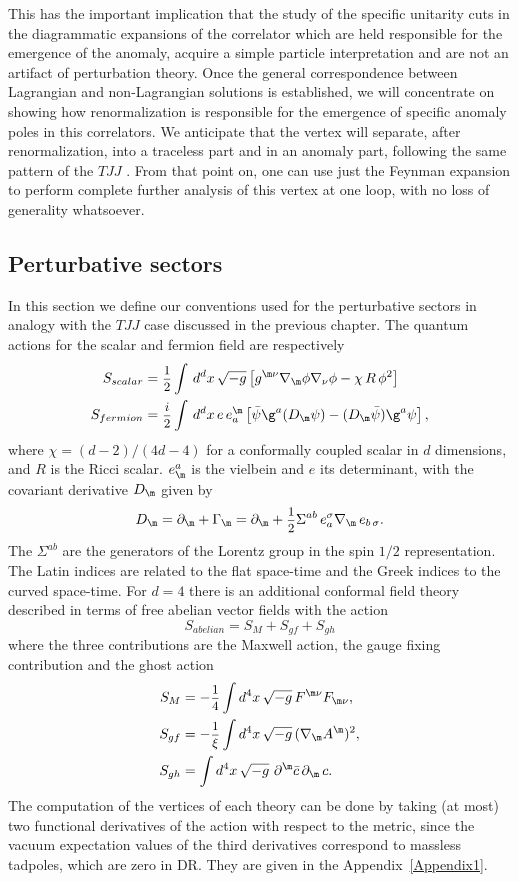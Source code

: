 \documentclass[a4paper,11pt,openright,twoside]{book}
\let\n=\nu      \let\x=\xi     \let\p=\pi      \let\r=\rho
\let\s=\sigma  \let\t=\tau     \let\u=\upsilon \let\f=\phi
\let\c=\chi     \let\y=\psi    \let\w=\omega
\newcommand{\sdfrac}[2]{\mbox{\small$\displaystyle\frac{#1}{#2}$}}
\newcommand{\appref}[1]{Appendix~\ref{#1}}		%
\numberwithin{equation}{section}
\begin{document}
{{This has the important implication that the study of the specific unitarity cuts in the diagrammatic expansions of the correlator \cite{Giannotti:2008cv, Coriano:2014gja} which are held responsible for the emergence of the anomaly, acquire a simple particle interpretation and are not an artifact of perturbation theory. Once the general correspondence between Lagrangian and non-Lagrangian solutions is established, we will concentrate on showing how renormalization is responsible for the emergence of specific anomaly poles 
in this correlators. We anticipate that the vertex will separate, after renormalization, into a traceless part and in an anomaly part, following the same pattern of the $TJJ$ \cite{Coriano:2018zdo}. From that point on, one can use just the Feynman expansion to perform complete further analysis of this vertex at one loop, with no loss of generality whatsoever. 
\subsection{Perturbative sectors}
In this section we define our conventions used for the perturbative sectors in analogy with the $TJJ$ case discussed in the previous chapter. The quantum actions for the scalar and fermion field are respectively
\begin{align}
	S_{scalar}&=\sdfrac{1}{2}\int\, d^dx\,\sqrt{-g}\left[g^{\m\n}\nabla_\m\phi\nabla_\n\phi-\c\, R\,\phi^2\right]\\
	S_{fermion}&=\sdfrac{i}{2}\int\, d^dx\,e\,e^{\m}_a\left[\bar{\psi}\g^a(D_\m\psi)-(D_\m\bar{\psi})\g^a\psi\right],
\end{align}
where $\c =(d-2)/(4d-4)$ for a conformally coupled scalar in $d$ dimensions, and $R$ is the Ricci scalar. $e_\m^a$ is the vielbein and $e$ its determinant,  with the covariant derivative $D_\m$ given by 
\begin{equation}
	D_\m=\partial_\m+\Gamma_\m=\partial_\m+\sdfrac{1}{2}\Sigma^{ab}\,e^\s_a\nabla_\m\,e_{b\,\s}.
\end{equation}
The $\Sigma^{ab}$ are the generators of the Lorentz group in the spin $1/2$ representation. The Latin indices are related to the flat space-time and the Greek indices to the curved space-time. 
For $d=4$ there is an additional conformal field theory described in terms of free abelian vector fields with the action
\begin{equation}
	S_{abelian}=S_{M}+S_{gf}+S_{gh}
\end{equation}
where the three contributions are the Maxwell action, the gauge fixing contribution and the ghost action
\begin{align}
	S_M&=-\sdfrac{1}{4}\int d^4x\,\sqrt{-g}\,F^{\m\n}F_{\m\n},\\
	S_{gf}&=-\sdfrac{1}{\xi}\int d^4x\,\sqrt{-g}\,(\nabla_\m A^\m)^2,\\
	S_{gh}&=\int d^4x\,\sqrt{-g}\,\,\partial^\m\bar c\,\partial_\m \,c.
\end{align}
The computation of the vertices of each theory can be done by taking (at most) two functional derivatives of the action with respect to the metric, since the vacuum expectation values of the third derivatives correspond to massless tadpoles, which are zero in DR. 
They are given in the \appref{Appendix1}.

}}
\end{document}
